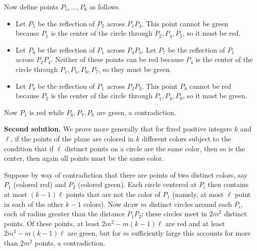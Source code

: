 \documentclass[amssymb,twocolumn,pra,10pt,aps]{revtex4-1}
\begin{document}
\begin{itemize}
Now define points $P_5,\dots,P_8$ as follows.
\begin{itemize}
\item
Let $P_5$ be the reflection of $P_2$ across $P_1P_4$.
This point cannot be green because $P_1$ is the center of the circle through $P_2, P_4, P_5$, so it must be red.
\item
Let $P_6$ be the reflection of $P_1$ across $P_4 P_5$.
Let $P_7$ be the reflection of $P_1$ across $P_2P_4$.
Neither of these points can be red because $P_4$ is the center of the circle through $P_1, P_5, P_6, P_7$, so they must be green.
\item
Let $P_8$ be the reflection of $P_1$ across $P_2 P_3$.
This point $P_8$ cannot be red because $P_2$ is the center of the circle through $P_1, P_3, P_8$, so it must be green.
\end{itemize}
Now $P_1$ is red while $P_6, P_7, P_8$ are green, a contradiction.

\begin{center}
\end{center}

\noindent
\textbf{Second solution.}
We prove more generally that for fixed positive integers $k$ and $\ell$,
if the points of the plane are colored in $k$ different colors subject to the condition that if $\ell$ distinct points on a circle are the same color, then so is the center, then again all points must be the same color.

Suppose by way of contradiction that there are points of two distinct colors, say $P_1$ (colored red) and $P_2$ (colored green). Each circle centered at $P_i$ then contains at most $(k-1)\ell$ points that are not the color of $P_1$ (namely, at most $\ell$ point in each of the other $k-1$ colors). Now draw $m$ distinct circles around each $P_i$, each of radius greater than the distance $P_1P_2$; these circles meet in $2m^2$ distinct points. Of these points, at least $2m^2 - m(k-1)\ell$ are red and at least $2m^2 - m(k-1)\ell$ are green, but for $m$ sufficiently large this accounts for more than $2m^2$ points, a contradiction.


\end{itemize}
\end{document}
